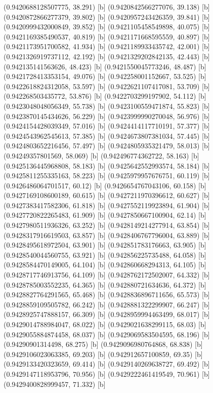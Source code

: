 {{{(0.9420688128507775, 38.291) [b] 
(0.9420842566277076, 39.138) [b] 
(0.9420872866277379, 39.802) [b] 
(0.9420957243426359, 39.841) [b] 
(0.9420999432000849, 39.852) [b] 
(0.9421105458549898, 40.075) [b] 
(0.9421169385490537, 40.819) [b] 
(0.9421171668595559, 40.897) [b] 
(0.9421173951700582, 41.934) [b] 
(0.9421189933435742, 42.001) [b] 
(0.9421326919737112, 42.192) [b] 
(0.9421329202842135, 42.443) [b] 
(0.942135141563626, 48.423) [b] 
(0.9421550045773246, 48.487) [b] 
(0.9421728413353154, 49.076) [b] 
(0.942258001152667, 53.525) [b] 
(0.9422618824312058, 53.597) [b] 
(0.9422621107417081, 53.709) [b] 
(0.942268503435772, 53.876) [b] 
(0.9422703299197902, 54.112) [b] 
(0.9423048048056349, 55.738) [b] 
(0.9423100559471874, 55.823) [b] 
(0.9423870145434626, 56.229) [b] 
(0.9423999990270048, 56.976) [b] 
(0.9424154428039349, 57.016) [b] 
(0.9424414117710191, 57.377) [b] 
(0.9424543962545613, 57.385) [b] 
(0.9424673807381034, 57.445) [b] 
(0.9424803652216456, 57.497) [b] 
(0.9424805935321479, 58.013) [b] 
(0.94249357801569, 58.069) [b] 
(0.942496774362722, 58.163) [b] 
(0.9425136445968808, 58.183) [b] 
(0.9425642552993574, 58.184) [b] 
(0.9425811255335163, 58.223) [b] 
(0.9425979957676751, 60.119) [b] 
(0.9426486064701517, 60.12) [b] 
(0.9426654767043106, 60.158) [b] 
(0.9427169108600189, 60.615) [b] 
(0.9427211970396612, 60.627) [b] 
(0.9427383417582306, 61.818) [b] 
(0.9427552119923894, 61.904) [b] 
(0.9427720822265483, 61.909) [b] 
(0.9427850667100904, 62.14) [b] 
(0.9427980511936326, 63.252) [b] 
(0.9428149214277914, 63.854) [b] 
(0.9428317916619503, 63.857) [b] 
(0.9428406767796004, 63.889) [b] 
(0.9428495618972504, 63.901) [b] 
(0.942851783176663, 63.905) [b] 
(0.9428540044560755, 63.921) [b] 
(0.942856225735488, 64.058) [b] 
(0.9428584470149005, 64.104) [b] 
(0.942860668294313, 64.105) [b] 
(0.9428717746913756, 64.109) [b] 
(0.9428762172502007, 64.332) [b] 
(0.9428785003552235, 64.365) [b] 
(0.942880721634636, 64.372) [b] 
(0.9428827764291565, 65.468) [b] 
(0.9428836896711656, 65.573) [b] 
(0.9428859109505782, 66.242) [b] 
(0.9428881322299907, 66.247) [b] 
(0.9428925747888157, 66.309) [b] 
(0.9428959994463499, 68.017) [b] 
(0.9429014788984047, 68.022) [b] 
(0.9429021638299115, 68.03) [b] 
(0.9429055884874458, 68.037) [b] 
(0.9429069583504595, 68.196) [b] 
(0.94290901314498, 68.275) [b] 
(0.9429096980764868, 68.838) [b] 
(0.9429106023063385, 69.203) [b] 
(0.942912657100859, 69.35) [b] 
(0.9429133420323659, 69.414) [b] 
(0.9429140269638727, 69.492) [b] 
(0.9429147118953796, 70.956) [b] 
(0.9429222461419549, 70.961) [b] 
(0.9429400828999457, 71.332) [b] 
}}}
